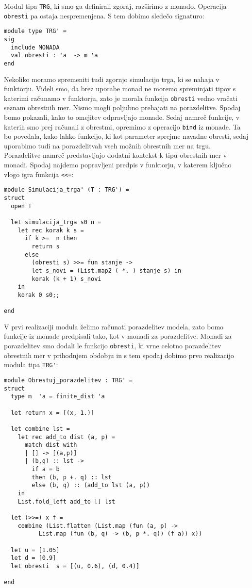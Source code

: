 \documentclass[a4paper,12pt]{article}
\theoremstyle{definition} %
\begin{document}
Modul tipa \lstinline{TRG}, ki smo ga definirali zgoraj, razširimo z monado. Operacija \lstinline{obresti} pa ostaja nespremenjena. S tem dobimo sledečo signaturo:
\begin{lstlisting}
module type TRG' =
sig
  include MONADA
  val obresti : 'a  -> m 'a
end
\end{lstlisting}
Nekoliko moramo spremeniti tudi zgornjo simulacijo trga, ki se nahaja v funktorju. Videli smo, da brez uporabe monad ne moremo spreminjati tipov s katerimi računamo v funktorju, zato je morala funkcija \lstinline{obresti} vedno vračati seznam obrestnih mer. Nismo mogli poljubno prehajati na porazdelitve. Spodaj bomo pokazali, kako to omejitev odpravljajo monade. Sedaj namreč funkcije, v katerih smo prej računali z obrestmi, opremimo z operacijo \lstinline{bind} iz monade. Ta bo povedala, kako lahko funkcijo, ki kot parameter sprejme navadne obresti, sedaj  uporabimo tudi na porazdelitvah vseh možnih obrestnih mer na trgu. Porazdelitve namreč predstavljajo dodatni kontekst k tipu obrestnih mer v monadi. Spodaj najdemo popravljeni predpis v funktorju, v katerem ključno vlogo igra funkcija \lstinline{<<=}:
\begin{lstlisting}
module Simulacija_trga' (T : TRG') =
struct
  open T

  let simulacija_trga s0 n =
    let rec korak k s =
      if k >=  n then
        return s
      else
        (obresti s) >>= fun stanje ->
        let s_novi = (List.map2 ( *. ) stanje s) in
        korak (k + 1) s_novi
    in
    korak 0 s0;;

end
\end{lstlisting}
V prvi realizaciji modula želimo računati porazdelitev modela, zato bomo funkcije iz monade predpisali tako, kot  v monadi za porazdelitve. Monadi za porazdelitev smo dodali le funkcijo \lstinline{obresti}, ki vrne celotno porazdelitev obrestnih mer v prihodnjem obdobju in s tem spodaj dobimo prvo realizacijo modula tipa \lstinline{TRG'}:
\begin{lstlisting}
module Obrestuj_porazdelitev : TRG' =
struct
  type m  'a = finite_dist 'a 

  let return x = [(x, 1.)]

  let combine lst =
    let rec add_to dist (a, p) =
      match dist with
      | [] -> [(a,p)]
      | (b,q) :: lst ->
        if a = b
        then (b, p +. q) :: lst
        else (b, q) :: (add_to lst (a, p))
    in
    List.fold_left add_to [] lst

  let (>>=) x f = 
	combine (List.flatten (List.map (fun (a, p) -> 
          List.map (fun (b, q) -> (b, p *. q)) (f a)) x))

  let u = [1.05]
  let d = [0.9]
  let obresti  s = [(u, 0.6), (d, 0.4)]

end
\end{lstlisting}
\end{document}
